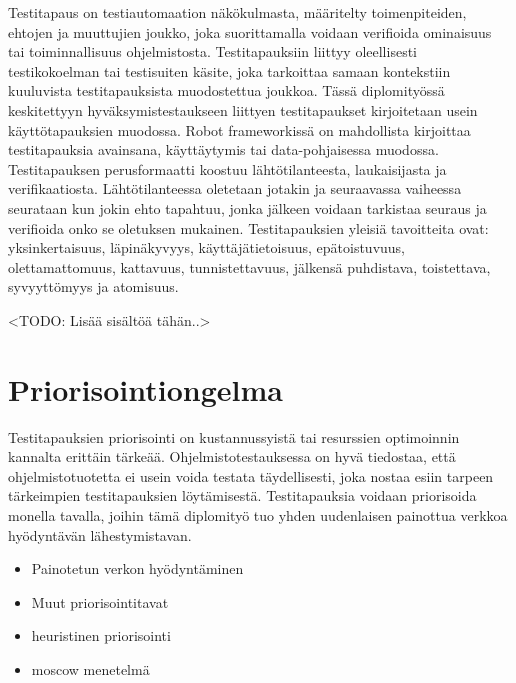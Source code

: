   Testitapaus on testiautomaation näkökulmasta, määritelty toimenpiteiden, ehtojen ja muuttujien joukko, joka suorittamalla voidaan verifioida ominaisuus tai toiminnallisuus ohjelmistosta.
  Testitapauksiin liittyy oleellisesti testikokoelman tai testisuiten käsite, joka tarkoittaa samaan kontekstiin kuuluvista testitapauksista muodostettua joukkoa.
  Tässä diplomityössä keskitettyyn hyväksymistestaukseen liittyen testitapaukset kirjoitetaan usein käyttötapauksien muodossa.
  Robot frameworkissä on mahdollista kirjoittaa testitapauksia avainsana, käyttäytymis tai data-pohjaisessa muodossa.
  Testitapauksen perusformaatti koostuu lähtötilanteesta, laukaisijasta ja verifikaatiosta.
  Lähtötilanteessa oletetaan jotakin ja seuraavassa vaiheessa seurataan kun jokin ehto tapahtuu, jonka jälkeen voidaan tarkistaa seuraus ja verifioida onko se oletuksen mukainen.
  Testitapauksien yleisiä tavoitteita ovat: yksinkertaisuus, läpinäkyvyys, käyttäjätietoisuus, epätoistuvuus, olettamattomuus, kattavuus, tunnistettavuus, jälkensä puhdistava, toistettava, syvyyttömyys ja atomisuus.

  <TODO: Lisää sisältöä tähän..>





\section{Priorisointiongelma} \label{ch:08_priorisointiongelma}

  Testitapauksien priorisointi on kustannussyistä tai resurssien optimoinnin kannalta erittäin tärkeää.
  Ohjelmistotestauksessa on hyvä tiedostaa, että ohjelmistotuotetta ei usein voida testata täydellisesti, joka nostaa esiin tarpeen tärkeimpien testitapauksien löytämisestä.
  Testitapauksia voidaan priorisoida monella tavalla, joihin tämä diplomityö tuo yhden uudenlaisen painottua verkkoa hyödyntävän lähestymistavan.

  \begin{itemize}
    \item Painotetun verkon hyödyntäminen
    \item Muut priorisointitavat
    \item heuristinen priorisointi
    \item moscow menetelmä
  \end{itemize}